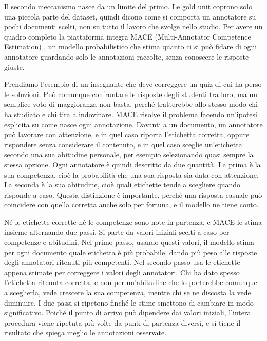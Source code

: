 \documentclass[]{sapthesis}
\begin{document}
Il secondo meccanismo nasce da un limite del primo. Le gold unit coprono solo una piccola parte del dataset, quindi dicono come si comporta un annotatore su pochi documenti scelti, non su tutto il lavoro che svolge nello studio. Per avere un quadro completo la piattaforma integra MACE (Multi-Annotator Competence Estimation) \parencite{hovy2013mace}, un modello probabilistico che stima quanto ci si può fidare di ogni annotatore guardando solo le annotazioni raccolte, senza conoscere le risposte giuste.

Prendiamo l'esempio di un insegnante che deve correggere un quiz di cui ha perso le soluzioni. Può comunque confrontare le risposte degli studenti tra loro, ma un semplice voto di maggioranza non basta, perché tratterebbe allo stesso modo chi ha studiato e chi tira a indovinare. MACE risolve il problema facendo un'ipotesi esplicita su come nasce ogni annotazione. Davanti a un documento, un annotatore può lavorare con attenzione, e in quel caso riporta l'etichetta corretta, oppure rispondere senza considerare il contenuto, e in quel caso sceglie un'etichetta secondo una sua abitudine personale, per esempio selezionando quasi sempre la stessa opzione. Ogni annotatore è quindi descritto da due quantità. La prima è la sua competenza, cioè la probabilità che una sua risposta sia data con attenzione. La seconda è la sua abitudine, cioè quali etichette tende a scegliere quando risponde a caso. Questa distinzione è importante, perché una risposta casuale può coincidere con quella corretta anche solo per fortuna, e il modello ne tiene conto.

Né le etichette corrette né le competenze sono note in partenza, e MACE le stima insieme alternando due passi. Si parte da valori iniziali scelti a caso per competenze e abitudini. Nel primo passo, usando questi valori, il modello stima per ogni documento quale etichetta è più probabile, dando più peso alle risposte degli annotatori ritenuti più competenti. Nel secondo passo usa le etichette appena stimate per correggere i valori degli annotatori. Chi ha dato spesso l'etichetta ritenuta corretta, e non per un'abitudine che lo porterebbe comunque a sceglierla, vede crescere la sua competenza, mentre chi se ne discosta la vede diminuire. I due passi si ripetono finché le stime smettono di cambiare in modo significativo. Poiché il punto di arrivo può dipendere dai valori iniziali, l'intera procedura viene ripetuta più volte da punti di partenza diversi, e si tiene il risultato che spiega meglio le annotazioni osservate.
\end{document}
